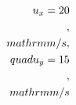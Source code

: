 \documentclass[preview]{standalone}
\begin{document}
\begin{align*}
\special{dvisvgm:raw <g id='unique000'>}u_x = 20\\,\\mathrm{m/s},\\quad u_y = 15\\,\\mathrm{m/s}\special{dvisvgm:raw </g>}
\end{align*}
\end{document}
